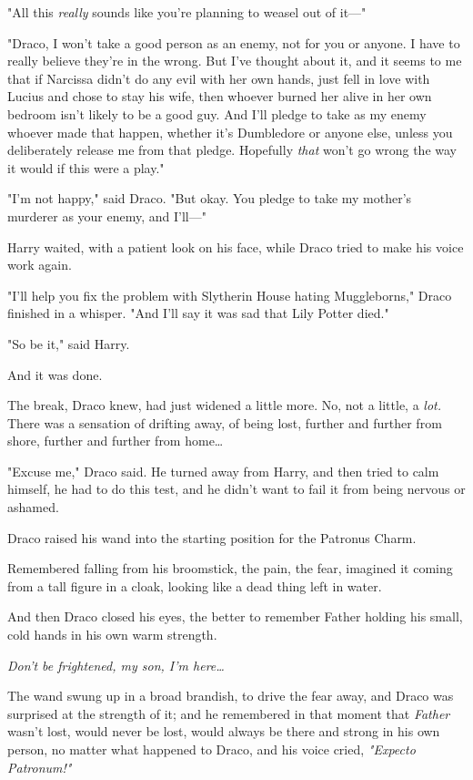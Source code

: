 "All this \emph{really} sounds like you're planning to weasel out of it---"

"Draco, I won't take a good person as an enemy, not for you or anyone. I have 
to really believe they're in the wrong. But I've thought about it, and it seems 
to me that if Narcissa didn't do any evil with her own hands, just fell in love 
with Lucius and chose to stay his wife, then whoever burned her alive in her 
own bedroom isn't likely to be a good guy. And I'll pledge to take as my enemy 
whoever made that happen, whether it's Dumbledore or anyone else, unless you 
deliberately release me from that pledge. Hopefully \emph{that} won't go wrong 
the way it would if this were a play."

"I'm not happy," said Draco. "But okay. You pledge to take my mother's murderer 
as your enemy, and I'll---"

Harry waited, with a patient look on his face, while Draco tried to make his 
voice work again.

"I'll help you fix the problem with Slytherin House hating Muggleborns," Draco 
finished in a whisper. "And I'll say it was sad that Lily Potter died."

"So be it," said Harry.

And it was done.

The break, Draco knew, had just widened a little more. No, not a little, a 
\emph{lot.} There was a sensation of drifting away, of being lost, further and 
further from shore, further and further from home{\ldots}

"Excuse me," Draco said. He turned away from Harry, and then tried to calm 
himself, he had to do this test, and he didn't want to fail it from being 
nervous or ashamed.

Draco raised his wand into the starting position for the Patronus Charm.

Remembered falling from his broomstick, the pain, the fear, imagined it coming 
from a tall figure in a cloak, looking like a dead thing left in water.

And then Draco closed his eyes, the better to remember Father holding his 
small, cold hands in his own warm strength.

\emph{Don't be frightened, my son, I'm here{\ldots}}

The wand swung up in a broad brandish, to drive the fear away, and Draco was 
surprised at the strength of it; and he remembered in that moment that 
\emph{Father} wasn't lost, would never be lost, would always be there and 
strong in his own person, no matter what happened to Draco, and his voice 
cried, \emph{"Expecto Patronum!"}

